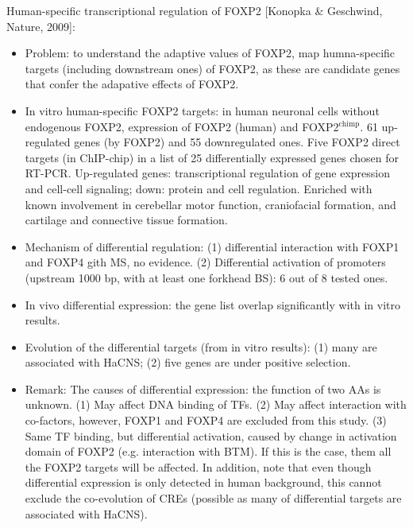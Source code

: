 \documentclass{report}
\begin{document}
Human-specific transcriptional regulation of FOXP2 [Konopka \& Geschwind, Nature, 2009]: 
\begin{itemize}
	\item Problem: to understand the adaptive values of FOXP2, map humna-specific targets (including downstream ones) of FOXP2, as these are candidate genes that confer the adapative effects of FOXP2. 
	
	\item In vitro human-specific FOXP2 targets: in human neuronal cells without endogenous FOXP2, expression of FOXP2 (human) and FOXP2$^{\text{chimp}}$. 61 up-regulated genes (by FOXP2) and 55 downregulated ones. Five FOXP2 direct targets (in ChIP-chip) in a list of 25 differentially expressed genes chosen for RT-PCR. Up-regulated genes: transcriptional regulation of gene expression and cell-cell signaling; down: protein and cell regulation. Enriched with known involvement in cerebellar motor function, craniofacial formation, and cartilage and connective tissue formation. 
	
	\item Mechanism of differential regulation: (1) differential interaction with FOXP1 and FOXP4 gith MS, no evidence. (2) Differential activation of promoters (upstream 1000 bp, with at least one forkhead BS): 6 out of 8 tested ones.
	
	\item In vivo differential expression: the gene list overlap significantly with in vitro results. 
	
	\item Evolution of the differential targets (from in vitro results): (1) many are associated with HaCNS; (2) five genes are under positive selection. 
	
	\item Remark: The causes of differential expression: the function of two AAs is unknown. (1) May affect DNA binding of TFs. (2) May affect interaction with co-factors, however, FOXP1 and FOXP4 are excluded from this study. (3) Same TF binding, but differential activation, caused by change in activation domain of FOXP2 (e.g. interaction with BTM). If this is the case, them all the FOXP2 targets will be affected. In addition, note that even though differential expression is only detected in human background, this cannot exclude the co-evolution of CREs (possible as many of differential targets are associated with HaCNS). 
\end{itemize}
\end{document}
